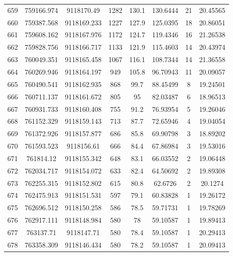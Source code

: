 \begin{longtable}{cccccccc}
659  & 759166.974      & 9118170.49       & 1282    & 130.1 & 130.6444 & 21 & 20.45565 \\
660  & 759387.568      & 9118169.233      & 1227    & 127.9 & 125.0395 & 18 & 20.86051 \\
661  & 759608.162      & 9118167.976      & 1172    & 124.7 & 119.4346 & 16 & 21.26538 \\
662  & 759828.756      & 9118166.717      & 1133    & 121.9 & 115.4603 & 14 & 20.43974 \\
663  & 760049.351      & 9118165.458      & 1067    & 116.1 & 108.7344 & 14 & 21.36558 \\
664  & 760269.946      & 9118164.197      & 949     & 105.8 & 96.70943 & 11 & 20.09057 \\
665  & 760490.541      & 9118162.935      & 868     & 99.7  & 88.45499 & 8  & 19.24501 \\
666  & 760711.137      & 9118161.672      & 805     & 95    & 82.03487 & 6  & 18.96513 \\
667  & 760931.733      & 9118160.408      & 755     & 91.2  & 76.93954 & 5  & 19.26046 \\
668  & 761152.329      & 9118159.143      & 713     & 87.7  & 72.65946 & 4  & 19.04054 \\
669  & 761372.926      & 9118157.877      & 686     & 85.8  & 69.90798 & 3  & 18.89202 \\
670  & 761593.523      & 9118156.61       & 666     & 84.4  & 67.86984 & 3  & 19.53016 \\
671  & 761814.12       & 9118155.342      & 648     & 83.1  & 66.03552 & 2  & 19.06448 \\
672  & 762034.717      & 9118154.072      & 633     & 82.4  & 64.50692 & 2  & 19.89308 \\
673  & 762255.315      & 9118152.802      & 615     & 80.8  & 62.6726  & 2  & 20.1274  \\
674  & 762475.913      & 9118151.531      & 597     & 79.1  & 60.83828 & 1  & 19.26172 \\
675  & 762696.512      & 9118150.258      & 586     & 78.5  & 59.71731 & 1  & 19.78269 \\
676  & 762917.111      & 9118148.984      & 580     & 78    & 59.10587 & 1  & 19.89413 \\
677  & 763137.71       & 9118147.71       & 580     & 78.4  & 59.10587 & 1  & 20.29413 \\
678  & 763358.309      & 9118146.434      & 580     & 78.2  & 59.10587 & 1  & 20.09413 \\

\end{longtable}
